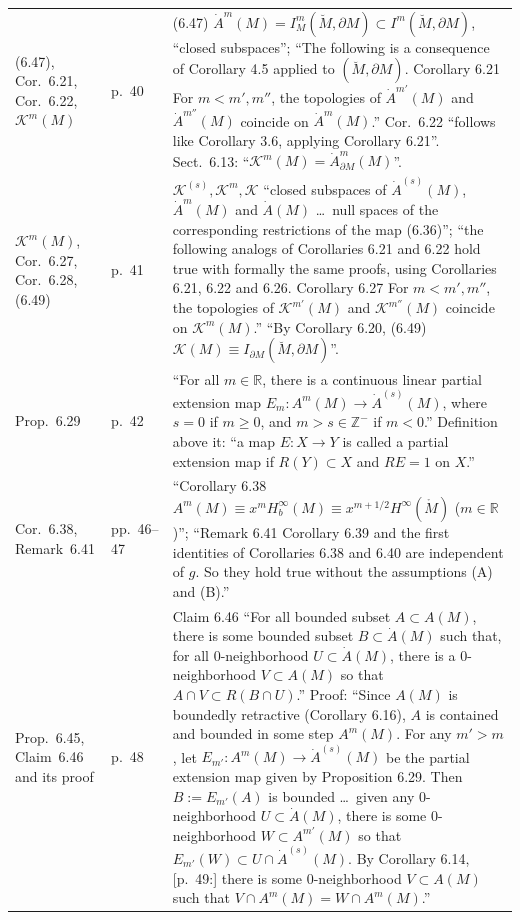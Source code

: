 \documentclass[11pt]{article}
\newcommand{\R}{\mathbb{R}}
\newcommand{\Mo}{\mathring{M}}
\newcommand{\Mb}{\breve{M}}
\begin{document}
{\begin{longtable}{@{}p{}p{}p{}@{}}
(6.47), Cor.~6.21, Cor.~6.22, $\mathcal K^m(M)$ & p.~40 & (6.47) $\dot A^m(M)=I^m_M(\Mb,\partial M)\subset I^m(\Mb,\partial M)$, ``closed subspaces''; ``The following is a consequence of Corollary 4.5 applied to $(\Mb,\partial M)$. Corollary 6.21 For $m<m',m''$, the topologies of $\dot A^{m'}(M)$ and $\dot A^{m''}(M)$ coincide on $\dot A^m(M)$.'' Cor.~6.22 ``follows like Corollary 3.6, applying Corollary 6.21''. Sect.~6.13: ``$\mathcal K^m(M)=\dot A^m_{\partial M}(M)$''.\\
$\mathcal K^m(M)$, Cor.~6.27, Cor.~6.28, (6.49) & p.~41 & $\mathcal K^{(s)},\mathcal K^m,\mathcal K$ ``closed subspaces of $\dot A^{(s)}(M)$, $\dot A^m(M)$ and $\dot A(M)$ \dots\ null spaces of the corresponding restrictions of the map (6.36)''; ``the following analogs of Corollaries 6.21 and 6.22 hold true with formally the same proofs, using Corollaries 6.21, 6.22 and 6.26. Corollary 6.27 For $m<m',m''$, the topologies of $\mathcal K^{m'}(M)$ and $\mathcal K^{m''}(M)$ coincide on $\mathcal K^m(M)$.'' ``By Corollary 6.20, (6.49) $\mathcal K(M)\equiv I_{\partial M}(\Mb,\partial M)$''.\\
Prop.~6.29 & p.~42 & ``For all $m\in\R$, there is a continuous linear partial extension map $E_m\colon A^m(M)\to\dot A^{(s)}(M)$, where $s=0$ if $m\ge0$, and $m>s\in\mathbb Z^-$ if $m<0$.'' Definition above it: ``a map $E\colon X\to Y$ is called a partial extension map if $R(Y)\subset X$ and $RE=1$ on $X$.''\\
Cor.~6.38, Remark~6.41 & pp.~46--47 & ``Corollary 6.38 $A^m(M)\equiv x^mH_b^\infty(M)\equiv x^{m+1/2}H^\infty(\Mo)$ ($m\in\R$)''; ``Remark 6.41 Corollary 6.39 and the first identities of Corollaries 6.38 and 6.40 are independent of $g$. So they hold true without the assumptions (A) and (B).''\\
Prop.~6.45, Claim~6.46 and its proof & p.~48 & Claim 6.46 ``For all bounded subset $A\subset A(M)$, there is some bounded subset $B\subset\dot A(M)$ such that, for all 0-neighborhood $U\subset\dot A(M)$, there is a 0-neighborhood $V\subset A(M)$ so that $A\cap V\subset R(B\cap U)$.'' Proof: ``Since $A(M)$ is boundedly retractive (Corollary 6.16), $A$ is contained and bounded in some step $A^m(M)$. For any $m'>m$, let $E_{m'}\colon A^m(M)\to\dot A^{(s)}(M)$ be the partial extension map given by Proposition 6.29. Then $B:=E_{m'}(A)$ is bounded \dots\ given any 0-neighborhood $U\subset\dot A(M)$, there is some 0-neighborhood $W\subset A^{m'}(M)$ so that $E_{m'}(W)\subset U\cap\dot A^{(s)}(M)$. By Corollary 6.14, [p.~49:] there is some 0-neighborhood $V\subset A(M)$ such that $V\cap A^m(M)=W\cap A^m(M)$.''\\

\end{longtable}}
\end{document}
